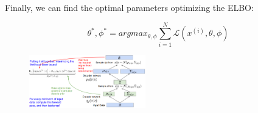 \documentclass[twoside]{article}
\begin{document}
Finally, we can find the optimal parameters optimizing the ELBO:

$$\theta^*, \phi^* = argmax_{\theta,\phi} \sum_{i=1}^{N} \mathcal{L}(x^{(i)},\theta,\phi)$$

\begin{figure}[h]
\centering
\includegraphics[width=0.45\textwidth]{img/vae_3.png}
\end{figure}
\end{document}
